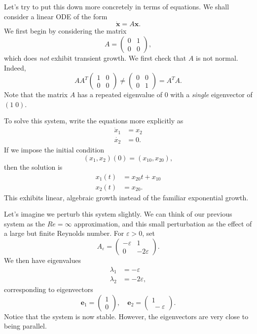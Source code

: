\documentclass[a4paper]{article}
\begin{document}
Let's try to put this down more concretely in terms of equations. We shall consider a linear ODE of the form
\[
  \dot{\mathbf{x}} = A \mathbf{x}.
\]
We first begin by considering the matrix
\[
  A =
  \begin{pmatrix}
    0 & 1\\
    0 & 0
  \end{pmatrix},
\]
which does \emph{not} exhibit transient growth. We first check that $A$ is not normal. Indeed,
\[
  AA^T
  \begin{pmatrix}
    1 & 0\\
    0 & 0
  \end{pmatrix} \not=
  \begin{pmatrix}
    0 & 0\\
    0 & 1
  \end{pmatrix} = A^T A.
\]
Note that the matrix $A$ has a repeated eigenvalue of $0$ with a \emph{single} eigenvector of $(1\; 0)$.

To solve this system, write the equations more explicitly as
\begin{align*}
  \dot{x}_1 &= x_2\\
  \dot{x_2} &= 0.
\end{align*}
If we impose the initial condition
\[
  (x_1, x_2)(0) = (x_{10}, x_{20}),
\]
then the solution is
\begin{align*}
  x_1(t) &= x_{20}t + x_{10}\\
  x_2(t) &= x_{20}.
\end{align*}
This exhibits linear, algebraic growth instead of the familiar exponential growth.

Let's imagine we perturb this system slightly. We can think of our previous system as the $Re = \infty$ approximation, and this small perturbation as the effect of a large but finite Reynolds number. For $\varepsilon > 0$, set
\[
  A_\varepsilon =
  \begin{pmatrix}
    -\varepsilon & 1\\
    0 & -2\varepsilon
  \end{pmatrix}.
\]
We then have eigenvalues
\begin{align*}
  \lambda_1 &= -\varepsilon\\
  \lambda_2 &= -2\varepsilon,
\end{align*}
corresponding to eigenvectors
\[
  \mathbf{e}_1 =
  \begin{pmatrix}
    1 \\0
  \end{pmatrix},\quad \mathbf{e}_2 =
  \begin{pmatrix}
    1 \\\ -\varepsilon
  \end{pmatrix}.
\]
Notice that the system is now stable. However, the eigenvectors are very close to being parallel.
\end{document}
